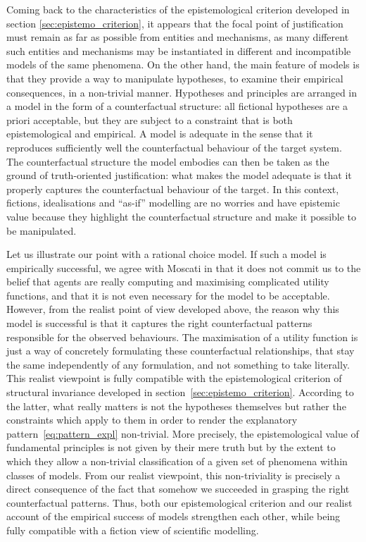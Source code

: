 \documentclass[a4paper,11pt]{article}
\theoremstyle{definition}
\begin{document}
Coming back to the characteristics of the epistemological criterion developed in section \ref{sec:epistemo_criterion}, it appears that the focal point of justification must remain as far as possible from entities and mechanisms, as many different such entities and mechanisms may be instantiated in different and incompatible models of the same phenomena. On the other hand, the main feature of models is that they provide a way to manipulate hypotheses, to examine their empirical consequences, in a non-trivial manner. Hypotheses and principles are arranged in a model in the form of a counterfactual structure: all fictional hypotheses are a priori acceptable, but they are subject to a constraint that is both epistemological and empirical. A model is adequate in the sense that it reproduces sufficiently well the counterfactual behaviour of the target system. The counterfactual structure the model embodies can then be taken as the ground of truth-oriented justification: what makes the model adequate is that it properly captures the counterfactual behaviour of the target. In this context, fictions, idealisations and ``as-if'' modelling are no worries and have epistemic value because they highlight the counterfactual structure and make it possible to be manipulated.

Let us illustrate our point with a rational choice model. If such a model is empirically successful, we agree with Moscati in that it does not commit us to the belief that agents are really computing and maximising complicated utility functions, and that it is not even necessary for the model to be acceptable. However, from the realist point of view developed above, the reason why this model is successful is that it captures the right counterfactual patterns responsible for the observed behaviours. The maximisation of a utility function is just a way of concretely formulating these counterfactual relationships, that stay the same independently of any formulation, and not something to take literally. This realist viewpoint is fully compatible with the epistemological criterion of structural invariance developed in section~\ref{sec:epistemo_criterion}. According to the latter, what really matters is not the hypotheses themselves but rather the constraints which apply to them in order to render the explanatory pattern~\eqref{eq:pattern_expl} non-trivial. More precisely, the epistemological value of fundamental principles is not given by their mere truth but by the extent to which they allow a non-trivial classification of a given set of phenomena within classes of models. From our realist viewpoint, this non-triviality is precisely a direct consequence of the fact that somehow we succeeded in grasping the right counterfactual patterns. Thus, both our epistemological criterion and our realist account of the empirical success of models strengthen each other, while being fully compatible with a fiction view of scientific modelling. 
\end{document}
